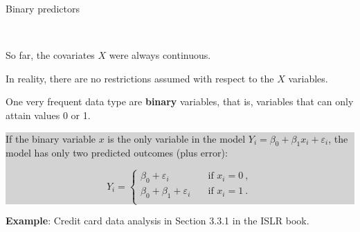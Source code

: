 \documentclass[10pt,ignorenonframetext,]{beamer}
\begin{document}
\begin{frame}

\begin{block}{Binary predictors}

\(~\)

So far, the covariates \(X\) were always continuous.\\
\vspace{2mm}

In reality, there are no restrictions assumed with respect to the \(X\)
variables. \vspace{2mm}

One very frequent data type are \textbf{binary} variables, that is,
variables that can only attain values 0 or 1. \vspace{4mm}

\colorbox{lightgray}{\begin{minipage}{10cm}
If the binary variable $x$ is the only variable in the model $Y_i = \beta_0 + \beta_1 x_i + \varepsilon_i$, the model has only two predicted outcomes (plus error):

\begin{equation*}
Y_i = \left\{ 
\begin{array}{ll}
 \beta_0  + \varepsilon_i \quad &\text{if } x_i=0 \ , \\
 \beta_0 + \beta_1 + \varepsilon_i \quad &\text{if } x_i =1 \ .\\
\end{array}
\right .
\end{equation*}
\end{minipage}}

\vspace{4mm}

\textbf{Example}: Credit card data analysis in Section 3.3.1 in the ISLR
book.

\end{block}

\end{frame}
\end{document}
